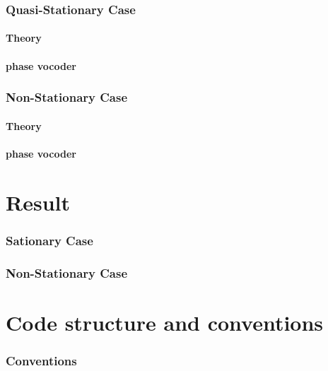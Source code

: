 \documentclass[]{article}
\begin{document}
\section{Quasi-Stationary Case}\label{quasi-stationary-case}
\subsection{Theory}\label{theory-quasi-stat}
\subsection{phase vocoder}\label{phase-vocoder-quasi-stationary}
\section{Non-Stationary Case}\label{non-stationary-case}
\subsection{Theory}\label{theory-non-stat}
\subsection{phase vocoder}\label{phase-vocoder-stationary}

\newpage
\part{Result}
\section{Sationary Case}\label{sec:sationary-results}
\section{Non-Stationary Case}\label{non-stationary-results}

\newpage
\part{Code structure and conventions}\label{sec:code-structure-and-conventions}

\section{Conventions}\label{sec:conventions}
\end{document}
